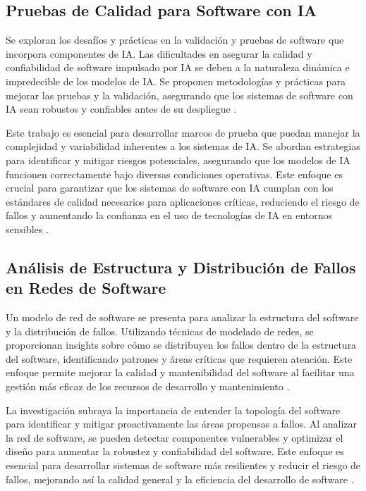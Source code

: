 \subsection{Pruebas de Calidad para Software con IA}

Se exploran los desafíos y prácticas en la validación y pruebas de software que incorpora componentes de IA. Las dificultades en asegurar la calidad y confiabilidad de software impulsado por IA se deben a la naturaleza dinámica e impredecible de los modelos de IA. Se proponen metodologías y prácticas para mejorar las pruebas y la validación, asegurando que los sistemas de software con IA sean robustos y confiables antes de su despliegue \cite{Tao2019}.

Este trabajo es esencial para desarrollar marcos de prueba que puedan manejar la complejidad y variabilidad inherentes a los sistemas de IA. Se abordan estrategias para identificar y mitigar riesgos potenciales, asegurando que los modelos de IA funcionen correctamente bajo diversas condiciones operativas. Este enfoque es crucial para garantizar que los sistemas de software con IA cumplan con los estándares de calidad necesarios para aplicaciones críticas, reduciendo el riesgo de fallos y aumentando la confianza en el uso de tecnologías de IA en entornos sensibles \cite{Tao2019}.

\subsection{Análisis de Estructura y Distribución de Fallos en Redes de Software}

Un modelo de red de software se presenta para analizar la estructura del software y la distribución de fallos. Utilizando técnicas de modelado de redes, se proporcionan insights sobre cómo se distribuyen los fallos dentro de la estructura del software, identificando patrones y áreas críticas que requieren atención. Este enfoque permite mejorar la calidad y mantenibilidad del software al facilitar una gestión más eficaz de los recursos de desarrollo y mantenimiento \cite{Ai2019}.

La investigación subraya la importancia de entender la topología del software para identificar y mitigar proactivamente las áreas propensas a fallos. Al analizar la red de software, se pueden detectar componentes vulnerables y optimizar el diseño para aumentar la robustez y confiabilidad del software. Este enfoque es esencial para desarrollar sistemas de software más resilientes y reducir el riesgo de fallos, mejorando así la calidad general y la eficiencia del desarrollo de software \cite{Ai2019}.

